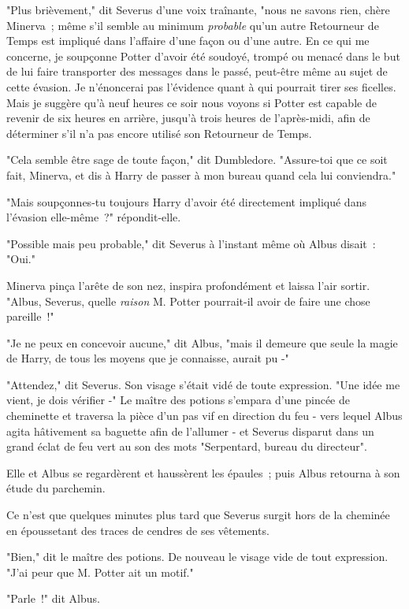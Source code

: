 "Plus brièvement," dit Severus d'une voix traînante, "nous ne savons rien, chère Minerva~; même s'il semble au minimum \emph{probable} qu'un autre Retourneur de Temps est impliqué dans l'affaire d'une façon ou d'une autre. En ce qui me concerne, je soupçonne Potter d'avoir été soudoyé, trompé ou menacé dans le but de lui faire transporter des messages dans le passé, peut-être même au sujet de cette évasion. Je n'énoncerai pas l'évidence quant à qui pourrait tirer ses ficelles. Mais je suggère qu'à neuf heures ce soir nous voyons si Potter est capable de revenir de six heures en arrière, jusqu'à trois heures de l'après-midi, afin de déterminer s'il n'a pas encore utilisé son Retourneur de Temps.

"Cela semble être sage de toute façon," dit Dumbledore. "Assure-toi que ce soit fait, Minerva, et dis à Harry de passer à mon bureau quand cela lui conviendra."

"Mais soupçonnes-tu toujours Harry d'avoir été directement impliqué dans l'évasion elle-même~?" répondit-elle.

"Possible mais peu probable," dit Severus à l'instant même où Albus disait~: "Oui."

Minerva pinça l'arête de son nez, inspira profondément et laissa l'air sortir. "Albus, Severus, quelle \emph{raison} M. Potter pourrait-il avoir de faire une chose pareille~!"

"Je ne peux en concevoir aucune," dit Albus, "mais il demeure que seule la magie de Harry, de tous les moyens que je connaisse, aurait pu -"

"Attendez," dit Severus. Son visage s'était vidé de toute expression. "Une idée me vient, je dois vérifier -" Le maître des potions s'empara d'une pincée de cheminette et traversa la pièce d'un pas vif en direction du feu - vers lequel Albus agita hâtivement sa baguette afin de l'allumer - et Severus disparut dans un grand éclat de feu vert au son des mots "Serpentard, bureau du directeur".

Elle et Albus se regardèrent et haussèrent les épaules~; puis Albus retourna à son étude du parchemin.

Ce n'est que quelques minutes plus tard que Severus surgit hors de la cheminée en époussetant des traces de cendres de ses vêtements.

"Bien," dit le maître des potions. De nouveau le visage vide de tout expression. "J'ai peur que M. Potter ait un motif."

"Parle~!" dit Albus.

